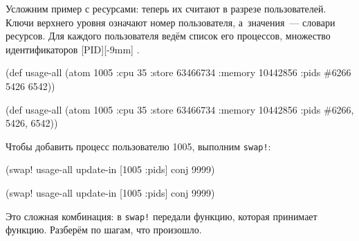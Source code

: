 
Усложним пример с ресурсами: теперь их считают в разрезе пользователей. Ключи
верхнего уровня означают номер пользователя, а~значения~--- словари
ресурсов. Для каждого пользователя ведём список его процессов, множество
идентификаторов [PID][-9mm]
.

\ifx\DEVICETYPE\MOBILE
\begin{english}
  \begin{clojure/lines}
(def usage-all
  (atom {1005 {:cpu 35
               :store 63466734
               :memory 10442856
               :pids #{6266 5426
                       6542}}}))
  \end{clojure/lines}
\end{english}

\else

\begin{english}
  \begin{clojure/lines}
(def usage-all
  (atom {1005 {:cpu 35
               :store 63466734
               :memory 10442856
               :pids #{6266, 5426, 6542}}}))
  \end{clojure/lines}
\end{english}
\fi


Чтобы добавить процесс пользователю 1005, выполним \verb|swap!|:

\ifx\DEVICETYPE\MOBILE

\begin{english}
  \begin{clojure}
(swap! usage-all
  update-in [1005 :pids] conj 9999)
  \end{clojure}
\end{english}

\else

\begin{english}
  \begin{clojure}
(swap! usage-all update-in [1005 :pids] conj 9999)
  \end{clojure}
\end{english}

\fi

Это сложная комбинация: в \verb|swap!| передали функцию, которая принимает
функцию. Разберём по шагам, что произошло.

